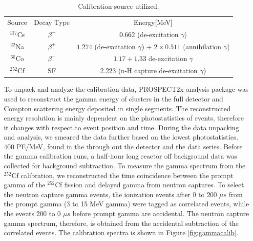 \begin{table}[h]
    \centering
    \begin{tabular}{c|c|c}
        Source & Decay Type & Energy[MeV]\\
        $^{137}$Cs  & $\beta^-$   & $0.662$ (de-excitation $\gamma$)\\
        $^{22}$Na   & $\beta^+$   & $1.274$ (de-excitation $ \gamma$) + $2\times0.511$ (annihilation $\gamma$) \\
        $^{60}$Co   & $\beta^-$   & $1.17 + 1.33$ de-excitation $\gamma$ \\
        $^{252}$Cf  & SF   & 2.223 (n-H capture de-excitation $\gamma$)
    \end{tabular}
    \caption{Calibration source utilized.}
    \label{tab:srctable}
\end{table}

To unpack and analyze the calibration data, PROSPECT2x analysis package was used to reconstruct the gamma energy of clusters in the full detector and Compton scattering energy deposited in single segments. 
The reconstructed energy resolution is mainly dependent on the photostatistics of events, therefore it changes with respect to event position and time. 
During the data unpacking and analysis, we smeared the data further based on the lowest photostatistics, 400 PE/MeV, found in the through out the detector and the data series.
Before the gamma calibration runs, a half-hour long reactor off background data was collected for background subtraction.
To measure the gamma spectrum from the $^{252}$Cf calibration, we reconstructed the time coincidence between the prompt gamma of the $^{252}$Cf fission and delayed gamma from neutron captures.
To select the neutron capture gamma events, the ionization events after 0 to 200 $\mu s$ from the prompt gamma (3 to 15 MeV gamma) were tagged as correlated events, while the events 200 to 0 $\mu s$ before prompt gamma are accidental.
The neutron capture gamma spectrum, therefore, is obtained from the accidental subtraction of the correlated events. 
The calibration spectra is shown in Figure \ref{fig:gammacalib}.

